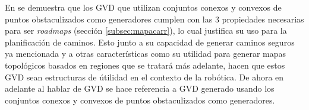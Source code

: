 En \cite{choset2005principles} se demuestra que los GVD que utilizan
conjuntos conexos y convexos de puntos obstaculizados como generadores cumplen
con las 3 propiedades necesarias para ser \emph{roadmaps} (sección
\ref{subsec:mapacarr}), lo cual justifica su uso para la planificación de caminos. Esto junto
a su capacidad de generar caminos seguros ya mencionada y a otras
características como su utilidad para generar mapas
topológicos basados en regiones que se tratará más adelante, hacen que estos GVD
sean estructuras de útilidad en
el contexto de la robótica. De ahora en adelante al hablar de GVD se
hace referencia a GVD generado usando los conjuntos conexos y convexos
de puntos obstaculizados como generadores.






